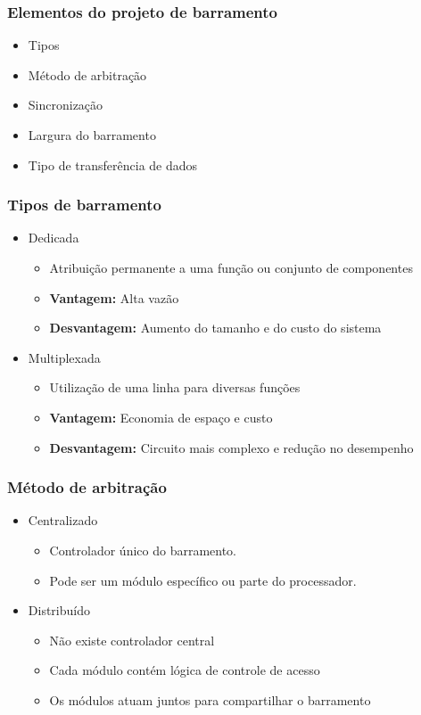 \documentclass[aspectratio=169,
				xcolor=table]{beamer}
\begin{document}
	\begin{frame}
		\frametitle{Elementos do projeto de barramento}
		\begin{itemize}
			\item Tipos
			\vspace{1em}
			\item Método de arbitração
			\vspace{1em}
			\item Sincronização
			\vspace{1em}
			\item Largura do barramento
			\vspace{1em}
			\item Tipo de transferência de dados
		\end{itemize}
	\end{frame}
	
	\begin{frame}
		\frametitle{Tipos de barramento}
		\begin{itemize}
			\item Dedicada
			\begin{itemize}
				\item Atribuição permanente a uma função ou conjunto de componentes
				\item \textbf{Vantagem:} Alta vazão
				\item \textbf{Desvantagem:} Aumento do tamanho e do  custo do sistema
			\end{itemize}
			\vspace{1em}
			\pause
			\item Multiplexada
			\begin{itemize}
				\item Utilização de uma linha para diversas funções
				\item \textbf{Vantagem:} Economia de espaço e custo
				\item \textbf{Desvantagem:} Circuito mais complexo e redução no desempenho
			\end{itemize}
			
		\end{itemize}
	\end{frame}
	
	\begin{frame}
		\frametitle{Método de arbitração}
		\begin{itemize}
			\item Centralizado 
			\begin{itemize}
				\item Controlador único do barramento. 
				\item Pode ser um módulo específico ou parte do processador.
			\end{itemize}
			\item Distribuído
			\begin{itemize}
				\item Não existe controlador central
				\item Cada módulo contém lógica de controle de acesso
				\item Os módulos atuam juntos para compartilhar o barramento
			\end{itemize}
		\end{itemize}
	\end{frame}
	
\end{document}
